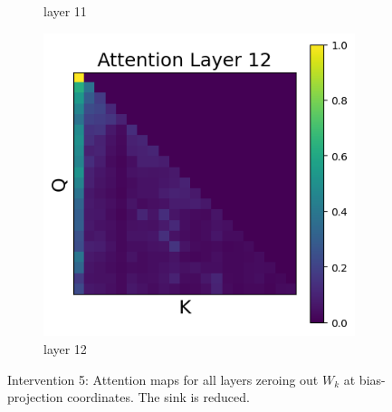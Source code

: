 \documentclass[11pt]{article}
\begin{document}
\begin{figure}[t]
\begin{subfigure}[t]{0.24\textwidth}
    \caption{layer 11}
  \end{subfigure}\hfill
  \begin{subfigure}[t]{0.24\textwidth}
    \centering
    \includegraphics[width=1.4\columnwidth]{figures/intervention5/layer_12.png}
    \caption{layer 12}
  \end{subfigure}\hfill

  \caption{Intervention 5: Attention maps for all layers zeroing out $W_k$ at bias-projection coordinates. The sink is reduced.}
\end{figure}
\end{document}
